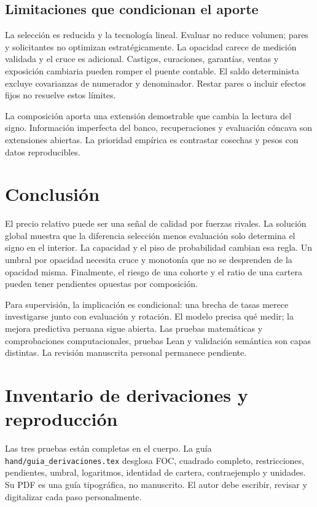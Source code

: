 \documentclass[11pt]{article}
\theoremstyle{definition}\newtheorem{assumption}{Supuesto}
\begin{document}
\subsection{Limitaciones que condicionan el aporte}
La selección es reducida y la tecnología lineal. Evaluar no reduce volumen;
pares y solicitantes no optimizan estratégicamente. La opacidad carece de
medición validada y el cruce es adicional. Castigos, curaciones, garantías,
ventas y exposición cambiaria pueden romper el puente contable. El saldo
determinista excluye covarianzas de numerador y denominador. Restar pares o
incluir efectos fijos no resuelve estos límites.

La composición aporta una extensión demostrable que cambia la lectura del
signo. Información imperfecta del banco, recuperaciones y evaluación cóncava
son extensiones abiertas. La prioridad empírica es contrastar cosechas y pesos
con datos reproducibles.

\section{Conclusión}
El precio relativo puede ser una señal de calidad por fuerzas rivales. La
solución global muestra que la diferencia selección menos evaluación solo
determina el signo en el interior. La capacidad y el piso de probabilidad
cambian esa regla. Un umbral por opacidad necesita cruce y monotonía que no
se desprenden de la opacidad misma. Finalmente, el riesgo de una cohorte y
el ratio de una cartera pueden tener pendientes opuestas por composición.

Para supervisión, la implicación es condicional: una brecha de tasas merece
investigarse junto con evaluación y rotación. El modelo precisa qué medir;
la mejora predictiva peruana sigue abierta. Las pruebas matemáticas y
comprobaciones computacionales, pruebas Lean y validación semántica son
capas distintas. La revisión manuscrita personal permanece pendiente.\label{body:end}
\clearpage

\clearpage\appendix

\section{Inventario de derivaciones y reproducción}
Las tres pruebas están completas en el cuerpo. La guía
\texttt{hand/guia\_derivaciones.tex} desglosa FOC, cuadrado completo,
restricciones, pendientes, umbral, logaritmos, identidad de cartera,
contraejemplo y unidades. Su PDF es una guía tipográfica, no manuscrito.
El autor debe escribir, revisar y digitalizar cada paso personalmente.
\end{document}
